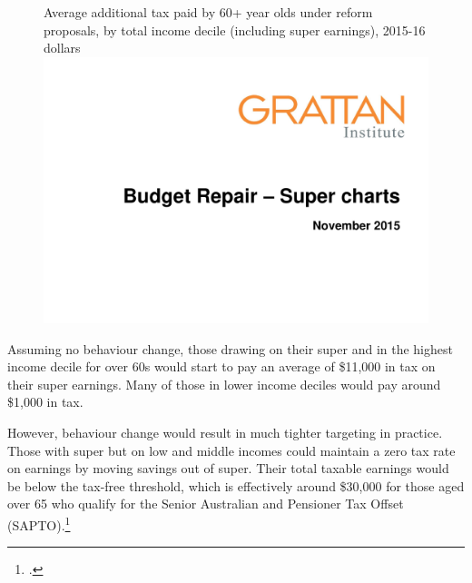\documentclass{grattanAlpha}
\begin{document}
\begin{figure}
%
{Average additional tax paid by 60+ year olds under reform proposals, by total income decile (including super earnings), 2015-16 dollars}
\includegraphics[width=\columnwidth,page=32]{super-atlas/PPTX.pdf}

\end{figure} 

Assuming no behaviour change, those drawing on their super and in the highest income decile for over 60s would start to pay an average of \$11,000 in tax on their super earnings. Many of those in lower income deciles would pay around \$1,000 in tax.

However, behaviour change would result in much tighter targeting in practice. Those with super but on low and middle incomes could maintain a zero tax rate on earnings by moving savings out of super. Their total taxable earnings would be below the tax-free threshold, which is effectively around \$30,000 for those aged over 65 who qualify for the Senior Australian and Pensioner Tax Offset (SAPTO).\footcite{ATO2015-Beneficiary-tax-offset-sapto-calculator}  
\end{document}
